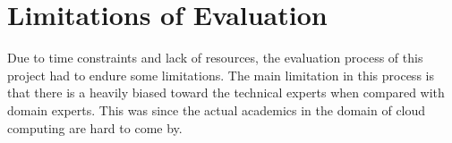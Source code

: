 
\section{Limitations of Evaluation}

Due to time constraints and lack of resources, the evaluation process of this project had to endure some limitations. The main limitation in this process is that there is a heavily biased toward the technical experts when compared with domain experts. This was since the actual academics in the domain of cloud computing are hard to come by.